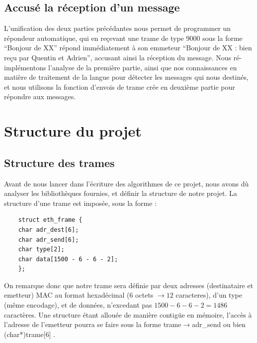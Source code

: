 \documentclass[a4paper,11pt]{article}
\begin{document}
	\subsection{Accusé la réception d'un message}
	L'unification des deux parties précédantes nous permet de programmer un répondeur automatique, qui en reçevant une trame de type 9000 sous la forme ``Bonjour de XX'' répond immédiatement à son emmeteur ``Bonjour de XX : bien reçu par Quentin et Adrien'', accusant ainsi la réception du message. Nous ré-implémentons l'analyse de la première partie, ainsi que nos connaissances en matière de traitement de la langue pour détecter les messages qui nous destinés, et nous utilisons la fonction d'envois de trame crée en deuxième partie pour répondre aux messages.
	\section{Structure du projet}
	\subsection{Structure des trames}
	Avant de nous lancer dans l'écriture des algorithmes de ce projet, nous avons dù analyser les bibliothèques fournies, et définir la structure de notre projet. La structure d'une trame est imposée, sous la forme :
	\lstset{language=C}
	\begin{lstlisting}
	struct eth_frame {
	char adr_dest[6];
	char adr_send[6];
	char type[2];
	char data[1500 - 6 - 6 - 2];
	};
	\end{lstlisting}
	On remarque donc que notre trame sera définie par deux adresses (destinataire et emetteur) MAC au format hexadécimal ($ 6$ octets $\to 12$ caracteres), d'un type (même encodage), et de données, n'excedant pas $1500-6-6-2=1486$ caractères. Une structure étant allouée de manière contigüe en mémoire, l'accès à l'adresse de l'emetteur pourra se faire sous la forme trame$\to$adr\_send ou bien (char*)trame[6] .
\end{document}
